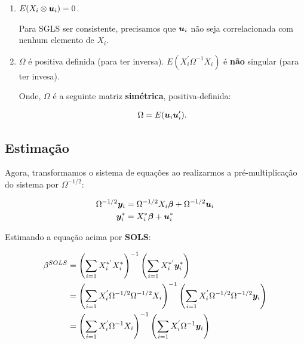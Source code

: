 \documentclass[11pt,oneside,a4paper]{article}
\numberwithin{equation}{section}
\begin{document}
\begin{enumerate}
\item %

$E(X_{i} \otimes \boldsymbol{u}_{i}) = 0$.

Para SGLS ser consistente, precisamos que $\boldsymbol{u}_{i}$ não seja correlacionada com nenhum elemento de $X_{i}$.

\item %

$\Omega$ é positiva definida (para ter inversa).
$E(X_{i}^{\prime} \Omega^{-1} X_{i})$ é \textbf{não} singular (para ter invesa).

Onde, $\Omega$ é a seguinte matriz \textbf{simétrica}, positiva-definida:

\vspace{-1.5 em}
\begin{align*}
\Omega = E(\boldsymbol{u}_{i} \boldsymbol{u}_{i}^{\prime}).
\end{align*}
\end{enumerate}

\subsection*{Estimação}

Agora, transformamos o sistema de equações ao realizarmos a pré-multiplicação do sistema por $\Omega^{-1/2}$:

\vspace{-1.5 em}
\begin{align*}
\Omega^{-1/2} \boldsymbol{y}_{i} 
&=
\Omega^{-1/2} X_{i} \boldsymbol{\beta}
+
\Omega^{-1/2} \boldsymbol{u}_{i}
\\
\boldsymbol{y}_{i}^{*}
&=
X_{i}^{*} \boldsymbol{\beta}
+
\boldsymbol{u}^{*}_{i}
\end{align*}

Estimando a equação acima por \textbf{SOLS}:

\vspace{-1.5 em}
\begin{align*}
\beta^{SOLS}
&=
\left( \sum_{i=1} X_{i}^{*'} X_{i}^{*} \right)^{-1}
\left( \sum_{i=1} X_{i}^{*'} \boldsymbol{y}_{i}^{*} \right)
\\
&=
\left( \sum_{i=1} X_{i}^{'} \Omega^{-1/2} \Omega^{-1/2} X_{i} \right)^{-1}
\left( \sum_{i=1} X_{i}^{'} \Omega^{-1/2} \Omega^{-1/2} \boldsymbol{y}_{i} \right)
\\
&=
\left( \sum_{i=1} X_{i}^{'} \Omega^{-1} X_{i} \right)^{-1}
\left( \sum_{i=1} X_{i}^{'} \Omega^{-1} \boldsymbol{y}_{i} \right)
\end{align*}
\end{document}
